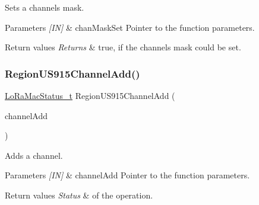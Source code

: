 Sets a channels mask. 


\begin{DoxyParams}{Parameters}
{\em \mbox{[}\+I\+N\mbox{]}} & chan\+Mask\+Set Pointer to the function parameters.\\
\hline
\end{DoxyParams}

\begin{DoxyRetVals}{Return values}
{\em Returns} & true, if the channels mask could be set. \\
\hline
\end{DoxyRetVals}
\mbox{\label{group__REGIONUS915_gad085905909fed76b2b7355aa2e22e1f7}} 
\subsubsection{\texorpdfstring{Region\+U\+S915\+Channel\+Add()}{RegionUS915ChannelAdd()}}
{\footnotesize\ttfamily \hyperlink{group__LORAMAC_ga30bd25657e10480f8605ee951b0ecfbd}{Lo\+Ra\+Mac\+Status\+\_\+t} Region\+U\+S915\+Channel\+Add (\begin{DoxyParamCaption}\item[{\hyperlink{group__REGION_gab1c5f3aa06614283202906cef4417860}{Channel\+Add\+Params\+\_\+t} $\ast$}]{channel\+Add }\end{DoxyParamCaption})}



Adds a channel. 


\begin{DoxyParams}{Parameters}
{\em \mbox{[}\+I\+N\mbox{]}} & channel\+Add Pointer to the function parameters.\\
\hline
\end{DoxyParams}

\begin{DoxyRetVals}{Return values}
{\em Status} & of the operation. \\
\hline
\end{DoxyRetVals}
\mbox{\label{group__REGIONUS915_gace049f46aefc7abb2152b6013ad5c0a6}} 
